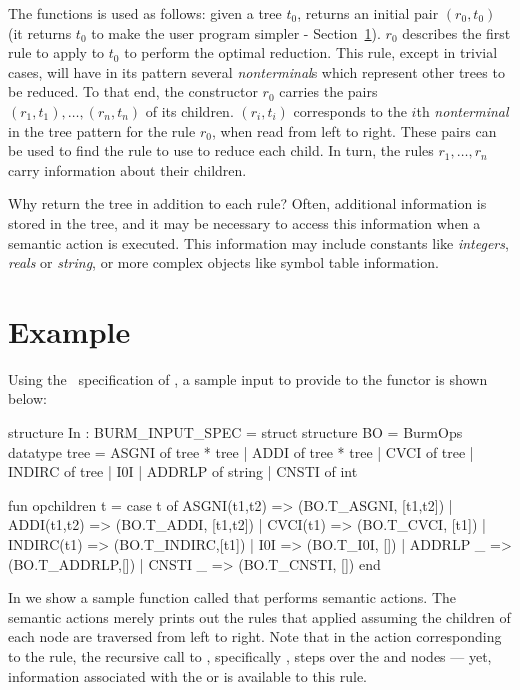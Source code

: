 \documentclass[11pt]{article}
\begin{document}
The functions  is used as follows: given a tree $t_0$,
 returns an initial pair $(r_0, t_0)$ (it returns $t_0$ to
make the user program simpler - Section\ \ref{s:example}).
$r_0$
describes the first rule to apply to $t_0$ to perform the optimal
reduction.  This rule, except in trivial cases, will have in its
pattern several {\sl nonterminal}s which represent other trees to be
reduced.  To that end, the constructor $r_0$ carries the pairs 
\mbox{$(r_1,t_1), \ldots, (r_n,t_n)$} of its children.
$(r_i,t_i)$ corresponds to the $i$th {\sl nonterminal} in the tree pattern
for the rule $r_0$, when read from left to right.  These pairs can be used
to find the rule to use to reduce each child. In turn, the rules $r_1,
\ldots, r_n$ carry information about their children.

Why return the tree in addition to each rule?  Often, additional
information is stored in the tree, and it may be necessary to access this
information when a semantic action is executed. This information may
include constants like {\em integers}, {\em reals} or {\em string}, or more
complex objects like symbol table information.


		\section{Example}
		\label{s:example}

Using the \mlburg\ specification of , a sample
input to provide to the functor  is shown below:
\begin{code}
      structure In : BURM_INPUT_SPEC = struct
	structure BO = BurmOps
	datatype tree = 
	      ASGNI  of tree * tree
	    | ADDI   of tree * tree
	    | CVCI   of tree
	    | INDIRC of tree
	    | I0I
	    | ADDRLP of string
	    | CNSTI  of int

	fun opchildren t =
	  case t of
	    ASGNI(t1,t2)  => (BO.T_ASGNI, [t1,t2])
	  | ADDI(t1,t2)   => (BO.T_ADDI,  [t1,t2])
	  | CVCI(t1)      => (BO.T_CVCI,  [t1])
	  | INDIRC(t1)    => (BO.T_INDIRC,[t1])
	  | I0I           => (BO.T_I0I,   [])
	  | ADDRLP _      => (BO.T_ADDRLP,[])
	  | CNSTI _       => (BO.T_CNSTI, [])
      end
\end{code}




In  we show a sample function called  that
performs semantic actions. The semantic actions merely prints out the
rules that applied assuming the children of each node are traversed
from left to right. Note that in the action corresponding to the
 rule, the recursive call to ,
specifically , steps over the  and 
nodes --- yet, information associated with the  or
 is available to this rule.
\end{document}
